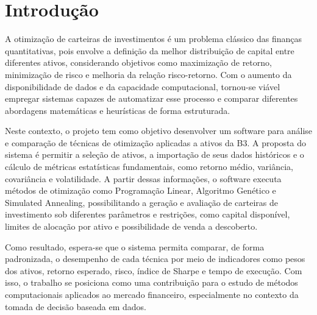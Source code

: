 \documentclass[
	12pt,				%
	openright,			%
	oneside,			    %
	a4paper,				%
	english,			%
	french,			%
	spanish,			%
	brazil			%
	]{abntex2}
\begin{document}

\frenchspacing 


\imprimircapa

\tableofcontents*
\cleardoublepage



\textual


\chapter{Introdução}

A otimização de carteiras de investimentos é um problema clássico das finanças quantitativas, pois envolve a definição da melhor distribuição de capital entre diferentes ativos, considerando objetivos como maximização de retorno, minimização de risco e melhoria da relação risco-retorno. Com o aumento da disponibilidade de dados e da capacidade computacional, tornou-se viável empregar sistemas capazes de automatizar esse processo e comparar diferentes abordagens matemáticas e heurísticas de forma estruturada.

Neste contexto, o projeto tem como objetivo desenvolver um software para análise e comparação de técnicas de otimização aplicadas a ativos da B3. A proposta do sistema é permitir a seleção de ativos, a importação de seus dados históricos e o cálculo de métricas estatísticas fundamentais, como retorno médio, variância, covariância e volatilidade. A partir dessas informações, o software executa métodos de otimização como Programação Linear, Algoritmo Genético e Simulated Annealing, possibilitando a geração e avaliação de carteiras de investimento sob diferentes parâmetros e restrições, como capital disponível, limites de alocação por ativo e possibilidade de venda a descoberto.

Como resultado, espera-se que o sistema permita comparar, de forma padronizada, o desempenho de cada técnica por meio de indicadores como pesos dos ativos, retorno esperado, risco, índice de Sharpe e tempo de execução. Com isso, o trabalho se posiciona como uma contribuição para o estudo de métodos computacionais aplicados ao mercado financeiro, especialmente no contexto da tomada de decisão baseada em dados.
\end{document}
